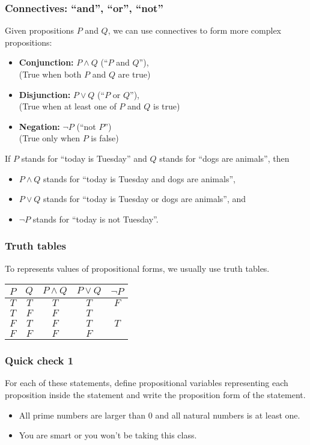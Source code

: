 \begin{frame}\frametitle{Connectives: ``and'', ``or'', ``not''}
  Given propositions $P$ and $Q$, we can use connectives to form more
  complex propositions:
  \begin{itemize}
  \item {\bf Conjunction:} $P\wedge Q$ (``$P$ and $Q$''), \\
    (True when both $P$ and $Q$ are true)
  \item {\bf Disjunction:} $P\vee Q$ (``$P$ or $Q$''), \\
    (True when at least one of $P$ and $Q$ is true)
  \item {\bf Negation:} $\neg P$ (``not $P$'') \\
    (True only when $P$ is false)
  \end{itemize}
  \pause

  If $P$ stands for ``today is Tuesday'' and $Q$ stands for
  ``dogs are animals'', then
  \begin{itemize}
  \item $P\wedge Q$ stands for ``today is Tuesday and dogs are animals'',
  \item $P\vee Q$ stands for ``today is Tuesday or dogs are animals'', and
  \item $\neg P$ stands for ``today is not Tuesday''.
  \end{itemize}
\end{frame}

\begin{frame}\frametitle{Truth tables}
  To represents values of propositional forms, we usually use truth tables.
  \begin{tcolorbox}[title=And/Or/Not]
    \begin{tabular}{|c|c||c|c|c|}
      \hline
      $P$ & $Q$ & $P\wedge Q$ & $P\vee Q$ & $\neg P$ \\
      \hline
      $T$ & $T$ & $T$ & $T$ & $F$ \\
      $T$ & $F$ & $F$ & $T$ & \\
      $F$ & $T$ & $F$ & $T$ & $T$ \\
      $F$ & $F$ & $F$ & $F$ & \\
      \hline
    \end{tabular}
  \end{tcolorbox}
\end{frame}

\begin{frame}\frametitle{Quick check 1}
  For each of these statements, define propositional variables
  representing each proposition inside the statement and write the
  proposition form of the statement.
  \begin{itemize}
  \item All prime numbers are larger than 0 and all natural numbers is
    at least one.
  \item You are smart or you won't be taking this class.
  \end{itemize}
\end{frame}

